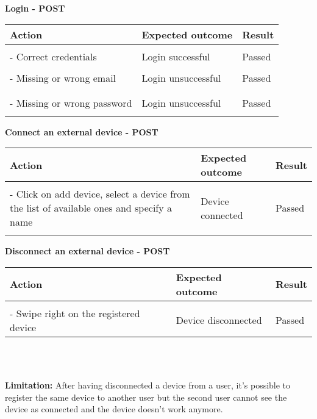 \textbf{Login - POST}
\begin{center}
	\begin{tabular}{|p{}|p{}|p{}|}
		\hline
		Action & Expected outcome & Result \\
		\hline
		&&\\
		- Correct credentials & Login successful & Passed\\
		\hline
		&&\\
		- Missing or wrong email & Login unsuccessful & Passed\\
		&&\\
		\hline
		&&\\
		- Missing or wrong password & Login unsuccessful & Passed\\
		&&\\
		\hline
	\end{tabular}
\end{center}

\newpage

\textbf{Connect an external device - POST}
\begin{center}
	\begin{tabular}{|p{}|p{}|p{}|}
		\hline
		Action & Expected outcome & Result \\
		\hline
		&&\\
		- Click on add device, select a device from the list of available ones and specify a name & Device connected & Passed\\
		&&\\
		\hline
	\end{tabular}
\end{center}

\textbf{Disconnect an external device - POST}
\begin{center}
	\begin{tabular}{|p{}|p{}|p{}|}
		\hline
		Action & Expected outcome & Result \\
		\hline
		&&\\
		- Swipe right on the registered device & Device disconnected & Passed\\
		\hline
	\end{tabular}
	\\
\end{center}

\textbf{\\Limitation:}
After having disconnected a device from a user, it's possible to register the same device to another user but the second user cannot see the device as connected and the device doesn't work anymore.



